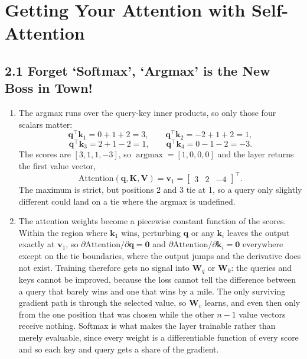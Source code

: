 \documentclass[11pt]{article}
\begin{document}
\section{Getting Your Attention with Self-Attention}

\subsection*{2.1 Forget `Softmax', `Argmax' is the New Boss in Town!}

\begin{enumerate}
  \item The argmax runs over the query-key inner products, so only those four scalars matter:
        \[
          \mathbf{q}^{\top}\mathbf{k}_1 = 0 + 1 + 2 = 3, \qquad
          \mathbf{q}^{\top}\mathbf{k}_2 = -2 + 1 + 2 = 1,
        \]
        \[
          \mathbf{q}^{\top}\mathbf{k}_3 = 2 + 1 - 2 = 1, \qquad
          \mathbf{q}^{\top}\mathbf{k}_4 = 0 - 1 - 2 = -3 .
        \]
        The scores are $[3, 1, 1, -3]$, so $\operatorname{argmax} = [1, 0, 0, 0]$ and the layer returns the
        first value vector,
        \[
          \text{Attention}(\mathbf{q}, \mathbf{K}, \mathbf{V}) = \mathbf{v}_1
          = \begin{bmatrix} 3 & 2 & -4 \end{bmatrix}^{\top} .
        \]
        The maximum is strict, but positions 2 and 3 tie at 1, so a query only slightly different could land
        on a tie where the argmax is undefined.

  \item The attention weights become a piecewise constant function of the scores. Within the region where
        $\mathbf{k}_1$ wins, perturbing $\mathbf{q}$ or any $\mathbf{k}_i$ leaves the output exactly at
        $\mathbf{v}_1$, so $\partial \text{Attention} / \partial \mathbf{q} = \mathbf{0}$ and
        $\partial \text{Attention} / \partial \mathbf{k}_i = \mathbf{0}$ everywhere except on the tie
        boundaries, where the output jumps and the derivative does not exist. Training therefore gets no signal
        into $\mathbf{W}_q$ or $\mathbf{W}_k$: the queries and keys cannot be improved, because the loss cannot
        tell the difference between a query that barely wins and one that wins by a mile. The only surviving
        gradient path is through the selected value, so $\mathbf{W}_v$ learns, and even then only from the one
        position that was chosen while the other $n-1$ value vectors receive nothing. Softmax is what makes the
        layer trainable rather than merely evaluable, since every weight is a differentiable function of every
        score and so each key and query gets a share of the gradient.
\end{enumerate}
\end{document}
